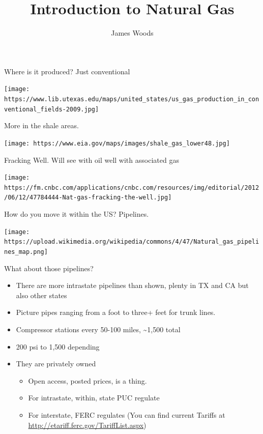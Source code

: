 \documentclass[
  ignorenonframetext,
]{beamer}
\title{Introduction to Natural Gas}
\author{James Woods}
\date{}
\providecommand{\tightlist}{%
  \setlength{\itemsep}{0pt}\setlength{\parskip}{0pt}}
\begin{document}
\frame{\titlepage}

\begin{frame}{Where is it produced? Just conventional}
\protect\hypertarget{where-is-it-produced-just-conventional}{}

\texttt{[image: https://www.lib.utexas.edu/maps/united\_states/us\_gas\_production\_in\_conventional\_fields-2009.jpg]}

\end{frame}

\begin{frame}{More in the shale areas.}
\protect\hypertarget{more-in-the-shale-areas.}{}

\texttt{[image: https://www.eia.gov/maps/images/shale\_gas\_lower48.jpg]}

\end{frame}

\begin{frame}{Fracking Well. Will see with oil well with associated gas}
\protect\hypertarget{fracking-well.-will-see-with-oil-well-with-associated-gas}{}

\texttt{[image: https://fm.cnbc.com/applications/cnbc.com/resources/img/editorial/2012/06/12/47784444-Nat-gas-fracking-the-well.jpg]}

\end{frame}

\begin{frame}{How do you move it within the US? Pipelines.}
\protect\hypertarget{how-do-you-move-it-within-the-us-pipelines.}{}

\texttt{[image: https://upload.wikimedia.org/wikipedia/commons/4/47/Natural\_gas\_pipelines\_map.png]}

\end{frame}

\begin{frame}{What about those pipelines?}
\protect\hypertarget{what-about-those-pipelines}{}

\begin{itemize}
\tightlist
\item
  There are more intrastate pipelines than shown, plenty in TX and CA
  but also other states
\item
  Picture pipes ranging from a foot to three+ feet for trunk lines.
\item
  Compressor stations every 50-100 miles, \textasciitilde{}1,500 total
\item
  200 psi to 1,500 depending
\item
  They are privately owned

  \begin{itemize}
  \tightlist
  \item
    Open access, posted prices, is a thing.
  \item
    For intrastate, within, state PUC regulate
  \item
    For interstate, FERC regulates (You can find current Tariffs at
    \url{http://etariff.ferc.gov/TariffList.aspx})
  \end{itemize}
\end{itemize}

\end{frame}
\end{document}
